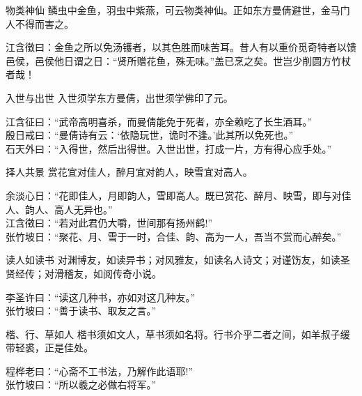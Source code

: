 \begin{yulu}{物类神仙}
鳞虫中金鱼，羽虫中紫燕，可云物类神仙。正如东方曼倩避世，金马门人不得而害之。
\begin{comments}
江含徵曰：金鱼之所以免汤镬者，以其色胜而味苦耳。昔人有以重价觅奇特者以馈邑侯，邑侯他日谓之日：“贤所赠花鱼，殊无味。”盖已烹之矣。世岂少削圆方竹杖者哉！
\end{comments}
\end{yulu}

\begin{yulu}{入世与出世}
入世须学东方曼倩，出世须学佛印了元。
\begin{comments}
江含征曰：“武帝高明喜杀，而曼倩能免于死者，亦全赖吃了长生酒耳。” \\
殷日戒曰：“曼倩诗有云：‘依隐玩世，诡时不逢。’此其所以免死也。” \\
石天外曰：“入得世，然后出得世。入世出世，打成一片，方有得心应手处。”
\end{comments}
\end{yulu}

\begin{yulu}{择人共景}
赏花宜对佳人，醉月宜对韵人，映雪宜对高人。
\begin{comments}
余淡心日：“花即佳人，月即韵人，雪即高人。既已赏花、醉月、映雪，即与对佳人、韵人、高人无异也。” \\
江含徵曰：“若对此君仍大嚼，世间那有扬州鹤!” \\
张竹坡日：“聚花、月、雪于一时，合佳、韵、高为一人，吾当不赏而心醉矣。”
\end{comments}
\end{yulu}

\begin{yulu}{读人如读书}
对渊博友，如读异书；对风雅友，如读名人诗文；对谨饬友，如读圣贤经传；对滑稽友，如阅传奇小说。
\begin{comments}
李圣许曰：“读这几种书，亦如对这几种友。” \\
张竹坡曰：“善于读书、取友之言。”
\end{comments}
\end{yulu}

\begin{yulu}{楷、行、草如人}
楷书须如文人，草书须如名将。行书介乎二者之间，如羊叔子缓带轻裘，正是佳处。
\begin{comments}
程桦老曰：“心斋不工书法，乃解作此语耶!” \\
张竹坡曰：“所以羲之必做右将军。”
\end{comments}
\end{yulu}

